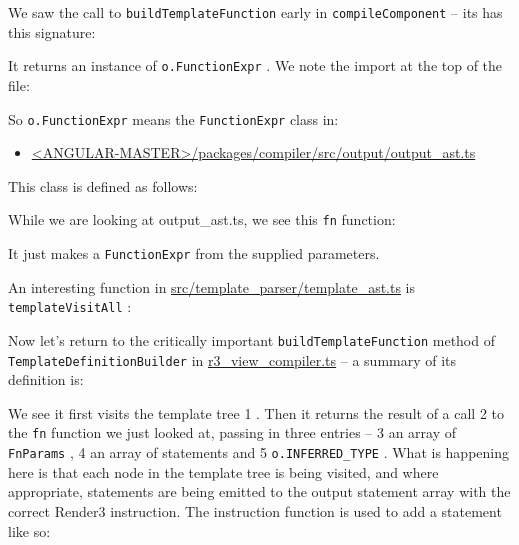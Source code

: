 

We saw the call to
\texttt{buildTemplateFunction}
early in
\texttt{compileComponent}
– its has this
signature:



It returns an instance of
\texttt{o.FunctionExpr}
. We note the import at the top of the file:



So
\texttt{o.FunctionExpr}
means the
\texttt{FunctionExpr}
class in:

\begin{itemize}
  \item \href{https://github.com/angular/angular/blob/master/packages/compiler/src/output/output_ast.ts}
        {<ANGULAR-MASTER>/packages/compiler/src/output/output\_ast.ts}
\end{itemize}

This class is defined as follows:



While we are looking at output\_ast.ts, we see this
\texttt{fn}
function:



It just makes a
\texttt{FunctionExpr}
from the supplied parameters.

An interesting function in
\url{src/template_parser/template_ast.ts}
is
\texttt{templateVisitAll}
:



Now let’s return to the critically important
\texttt{buildTemplateFunction}
method of
\texttt{TemplateDefinitionBuilder}
in
\url{r3_view_compiler.ts}
– a summary of its definition is:



We see it first visits the template tree
1
. Then it returns the result of a call
2
to the
\texttt{fn}
function we just looked at, passing in three entries –
3
an array of
\texttt{FnParams}
,
4
an
array of statements and
5
\texttt{o.INFERRED\_TYPE}
. What is happening here is that each
node in the template tree is being visited, and where appropriate, statements are
being emitted to the output statement array with the correct Render3 instruction. The
instruction function is used to add a statement like so:

